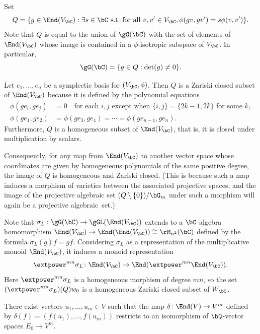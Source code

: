 Set
\[
Q = \{ g \in \End(V_\bC) : \exists s \in \bC \text{ s.t.\ for all } v, v' \in V_\bC, \phi(gv, gv') = s \phi(v,v') \}.
\]
Note that $Q$ is equal to the union of $\gG(\bC)$ with the set of elements of $\End(V_\bC)$ whose image is contained in a $\phi$-isotropic subspace of $V_\bC$.
In particular,
\[
\gG(\bC) = \{ g \in Q : \det(g) \neq 0 \}.
\]

Let $e_1, \dotsc, e_n$ be a symplectic basis for $(V_\bC, \phi)$.
Then $Q$ is a Zariski closed subset of $\End(V_\bC)$ because it is defined by the polynomial equations
\begin{align*}
\phi(ge_i, ge_j) &= 0 \quad\text{for each } i, j \text{ except when } \{ i,j \} = \{ 2k-1,2k \} \text{ for some } k,
\\ \phi(ge_1, ge_2) &= \phi(ge_3, ge_4) = \dotsb = \phi(ge_{n-1}, ge_n).
\end{align*}
Furthermore, $Q$ is a homogeneous subset of $\End(V_\bC)$, that is, it is closed under multiplication by scalars.

Consequently, for any map from $\End(V_\bC)$ to another vector space whose coordinates are given by homogeneous polynomials of the same positive degree, the image of $Q$ is homogeneous and Zariski closed.
(This is because such a map induces a morphism of varieties between the associated projective spaces, and the image of the projective alge\-braic set $(Q \setminus \{0\})/\bG_m$ under such a morphism will again be a projective algebraic~set.)

Note that $\sigma_L : \gG(\bC) \to \gGL(\End(V_\bC))$ extends to a $\bC$-algebra homomorphism $\End(V_\bC) \to \End(\End(V_\bC)) \cong \rM_{n^2}(\bC)$ defined by the formula $\sigma_L(g)f = gf$. Considering $\sigma_L$ as a representation of the multiplicative monoid $\End(V_\bC)$, it induces a monoid representation
\[
\extpower^{mn} \sigma_L \colon\End(V_\bC) \to \End(\extpower^{mn} \End(V_\bC)).
\]
Here $\extpower^{mn} \sigma_L$ is a homogeneous morphism of degree $mn$, so the set $(\extpower^{mn} \sigma_L)(Q)w_0$ is a homogeneous Zariski closed subset of $W_\bC$.

\begin{lemma} \label{exist-u}
There exist vectors $u_1, \dotsc, u_m \!\in\! V$ such that the map \hbox{$\delta \colon \End(V) \to V^m$} defined by $\delta(f) = (f(u_1), \dotsc, f(u_m))$ restricts to an isomorphism of $\bQ$-vector spaces $E_0 \to V^m$.
\end{lemma}

